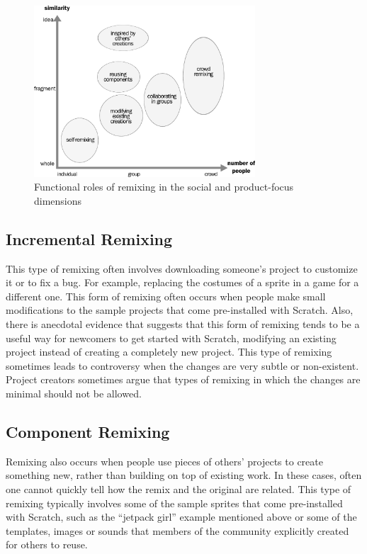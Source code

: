 \begin{figure}
\centering
\includegraphics[width=3.25in]{figures/function.pdf}
\caption{Functional roles of remixing in the social and product-focus dimensions}
\label{fig:function}
\end{figure}

\subsection{Incremental Remixing}
This type of remixing often involves downloading someone's project to customize it or to fix a bug. 
For example, replacing the costumes of a sprite in a game for a different one. 
This form of remixing often occurs when people make small modifications to the sample projects that come pre-installed with Scratch.
Also, there is anecdotal evidence that suggests that this form of remixing tends to be a useful way for newcomers to get started with Scratch,  modifying an existing project instead of creating a completely new project.
This type of remixing sometimes leads to controversy when the changes are very subtle or non-existent.
Project creators sometimes argue that types of remixing in which the changes are minimal should not be allowed.

\subsection{Component Remixing}
Remixing also occurs when people use pieces of others' projects to create something new, rather than building on top of existing work.   
In these cases, often one cannot quickly tell how the remix and the original are related.
This type of remixing typically involves some of the sample sprites that come pre-installed with Scratch, such as the ``jetpack girl'' example mentioned above or some of the templates, images or sounds that members of the community explicitly created for others to reuse.


